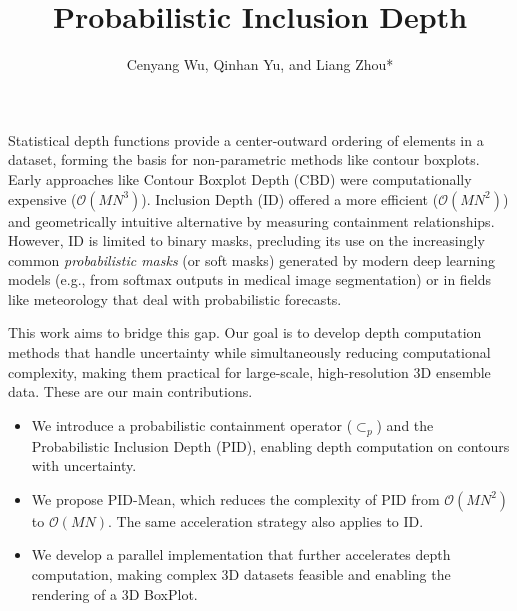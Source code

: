 \documentclass[review,journal]{vgtc}              %
\title{Probabilistic Inclusion Depth}
\author{%
  Cenyang Wu, Qinhan Yu, and 
  Liang Zhou*
}
\begin{document}

\maketitle

Statistical depth functions provide a center-outward ordering of elements in a dataset, forming the basis for non-parametric methods like contour boxplots. Early approaches like Contour Boxplot Depth (CBD) were computationally expensive ($\mathcal{O}(MN^3)$). Inclusion Depth (ID) offered a more efficient ($\mathcal{O}(MN^2)$) and geometrically intuitive alternative by measuring containment relationships. However, ID is limited to binary masks, precluding its use on the increasingly common \emph{probabilistic masks} (or soft masks) generated by modern deep learning models (e.g., from softmax outputs in medical image segmentation) or in fields like meteorology that deal with probabilistic forecasts.

This work aims to bridge this gap. Our goal is to develop depth computation methods that handle uncertainty while simultaneously reducing computational complexity, making them practical for large-scale, high-resolution 3D ensemble data.
These are our main contributions.
\begin{itemize}
    \item We introduce a probabilistic containment operator ($\subset_{\!p}$) and the Probabilistic Inclusion Depth (PID), enabling depth computation on contours with uncertainty.
    \item We propose PID-Mean, which reduces the complexity of PID from $\mathcal{O}(MN^2)$ to $\mathcal{O}(MN)$. The same acceleration strategy also applies to ID.
    \item We develop a parallel implementation that further accelerates depth computation, making complex 3D datasets feasible and enabling the rendering of a 3D BoxPlot.
\end{itemize}
\end{document}
